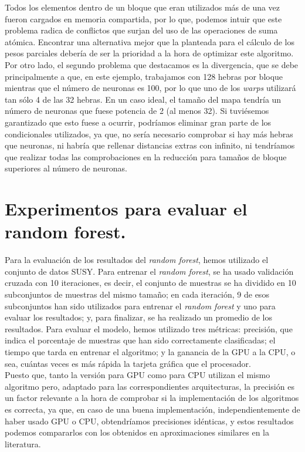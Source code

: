  Todos los elementos dentro de un bloque que eran utilizados más de una vez fueron cargados en memoria compartida, por lo que, podemos intuir que este problema radica de conflictos que surjan del uso de las operaciones de suma atómica. Encontrar una alternativa mejor que la planteada para el cálculo de los pesos parciales debería de ser la prioridad a la hora de optimizar este algoritmo. \\

 Por otro lado, el segundo problema que destacamos es la divergencia, que se debe principalmente a que, en este ejemplo, trabajamos con 128 hebras por bloque mientras que el número de neuronas es 100, por lo que uno de los \textit{warps} utilizará tan sólo 4 de las 32 hebras. En un caso ideal, el tamaño del mapa tendría un número de neuronas que fuese potencia de 2 (al menos 32). Si tuviésemos garantizado que esto fuese a ocurrir, podríamos eliminar gran parte de los condicionales utilizados, ya que, no sería necesario comprobar si hay más hebras que neuronas, ni habría que rellenar distancias extras con infinito, ni tendríamos que realizar todas las comprobaciones en la reducción para tamaños de bloque superiores al número de neuronas.

\section{Experimentos para evaluar el random forest.}
Para la evaluación de los resultados del \textit{random forest}, hemos utilizado el conjunto de datos SUSY. Para entrenar el \textit{random forest}, se ha usado validación cruzada con 10 iteraciones, es decir, el conjunto de muestras se ha dividido en 10 subconjuntos de muestras del mismo tamaño; en cada iteración, 9 de esos subconjuntos han sido utilizados para entrenar el \textit{random forest} y uno para evaluar los resultados; y, para finalizar, se ha realizado un promedio de los resultados. Para evaluar el modelo, hemos utilizado tres métricas: precisión, que indica el porcentaje de muestras que han sido correctamente clasificadas; el tiempo que tarda en entrenar el algoritmo; y la ganancia de la GPU a la CPU, o sea, cuántas veces es más rápida la tarjeta gráfica que el procesador. \\

Puesto que, tanto la versión para GPU como para CPU utilizan el mismo algoritmo pero, adaptado para las correspondientes arquitecturas, la precisión es un factor relevante a la hora de comprobar si la implementación de los algoritmos es correcta, ya que, en caso de una buena implementación, independientemente de haber usado GPU o CPU, obtendríamos precisiones idénticas, y estos resultados podemos compararlos con los obtenidos en aproximaciones similares en la literatura. \\

